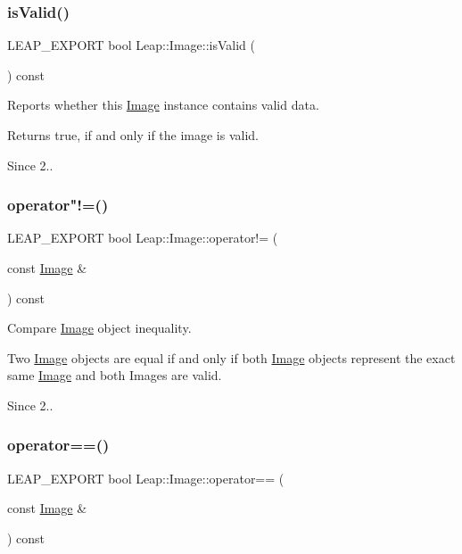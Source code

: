 \subsubsection{\texorpdfstring{is\+Valid()}{isValid()}}
{\footnotesize\ttfamily L\+E\+A\+P\+\_\+\+E\+X\+P\+O\+RT bool Leap\+::\+Image\+::is\+Valid (\begin{DoxyParamCaption}{ }\end{DoxyParamCaption}) const}

Reports whether this \hyperlink{class_leap_1_1_image}{Image} instance contains valid data.

\begin{DoxyReturn}{Returns}
true, if and only if the image is valid. 
\end{DoxyReturn}
\begin{DoxySince}{Since}
2.. 
\end{DoxySince}
\mbox{\label{class_leap_1_1_image_a4ae4bb6f8dc39f0733f13de8f5ffbcf1}} 
\subsubsection{\texorpdfstring{operator"!=()}{operator!=()}}
{\footnotesize\ttfamily L\+E\+A\+P\+\_\+\+E\+X\+P\+O\+RT bool Leap\+::\+Image\+::operator!= (\begin{DoxyParamCaption}\item[{const \hyperlink{class_leap_1_1_image}{Image} \&}]{ }\end{DoxyParamCaption}) const}

Compare \hyperlink{class_leap_1_1_image}{Image} object inequality.

Two \hyperlink{class_leap_1_1_image}{Image} objects are equal if and only if both \hyperlink{class_leap_1_1_image}{Image} objects represent the exact same \hyperlink{class_leap_1_1_image}{Image} and both Images are valid. \begin{DoxySince}{Since}
2.. 
\end{DoxySince}
\mbox{\label{class_leap_1_1_image_a3418f0859f414d56bdfa19704020851c}} 
\subsubsection{\texorpdfstring{operator==()}{operator==()}}
{\footnotesize\ttfamily L\+E\+A\+P\+\_\+\+E\+X\+P\+O\+RT bool Leap\+::\+Image\+::operator== (\begin{DoxyParamCaption}\item[{const \hyperlink{class_leap_1_1_image}{Image} \&}]{ }\end{DoxyParamCaption}) const}


